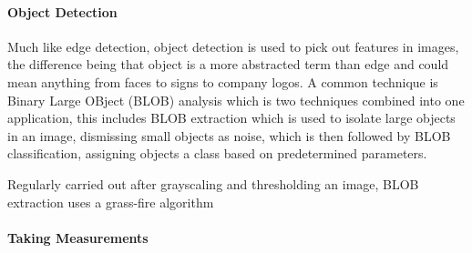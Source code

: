 	\paragraph{Object Detection}
	Much like edge detection, object detection is used to pick out features in images, the difference being that object is a more abstracted term than edge and could mean anything from faces to signs to company logos. A common technique is Binary Large OBject (BLOB) analysis which is two techniques combined into one application, this includes BLOB extraction which is used to isolate large objects in an image, dismissing small objects as noise, which is then followed by BLOB classification, assigning objects a class based on predetermined parameters.
	
	Regularly carried out after grayscaling and thresholding an image, BLOB extraction uses a grass-fire algorithm
	\paragraph{Taking Measurements}